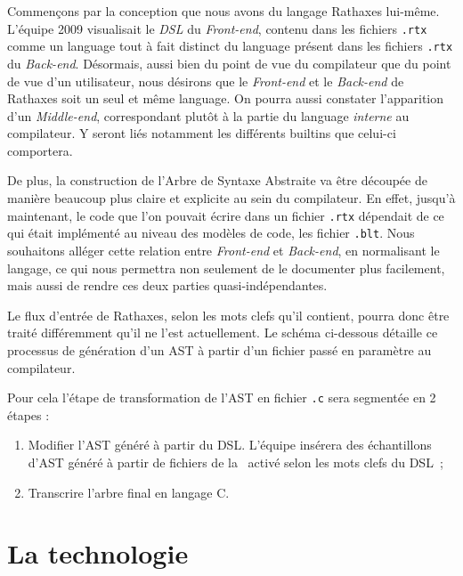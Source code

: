 \documentclass{rtxreport}
\begin{document}
Commençons par la conception que nous avons du langage Rathaxes
lui-même. L'équipe 2009 visualisait le \emph{DSL} du \emph{Front-end},
contenu dans les fichiers \texttt{.rtx} comme un language tout à fait
distinct du language présent dans les fichiers \texttt{.rtx} du
\emph{Back-end}. Désormais, aussi bien du point de vue du compilateur que
du point de vue d'un utilisateur, nous désirons que le \emph{Front-end} et
le \emph{Back-end} de Rathaxes soit un seul et même language. On pourra
aussi constater l'apparition d'un \emph{Middle-end}, correspondant plutôt
à la partie du language \emph{interne} au compilateur. Y seront liés
notamment les différents builtins que celui-ci comportera.

De plus, la construction de l'Arbre de Syntaxe Abstraite va être
découpée de manière beaucoup plus claire et explicite au sein du
compilateur.
En effet, jusqu'à maintenant, le code que l'on pouvait écrire dans un
fichier \texttt{.rtx} dépendait de ce qui était implémenté au
niveau des modèles de code, les fichier \texttt{.blt}. Nous souhaitons
alléger cette relation entre \emph{Front-end} et \emph{Back-end}, en
normalisant le langage, ce qui nous permettra non seulement de le documenter
plus facilement, mais aussi de rendre ces deux parties quasi-indépendantes.

Le flux d'entrée de Rathaxes, selon les mots clefs qu'il contient,
pourra donc être traité différemment qu'il ne l'est actuellement.
Le schéma ci-dessous détaille ce processus de génération d'un
AST à partir d'un fichier passé en paramètre au compilateur.


Pour cela l'étape de transformation de l'AST en fichier \texttt{.c} sera
segmentée en 2 étapes :
\begin{enumerate}
\item Modifier l'AST généré à partir du DSL. L'équipe insérera des échantillons
d'AST généré à partir de fichiers de la \BL\ activé selon les mots clefs du
DSL~;
\item Transcrire l'arbre final en langage C.
\end{enumerate}

\chapter{La technologie \rtx}
\end{document}
